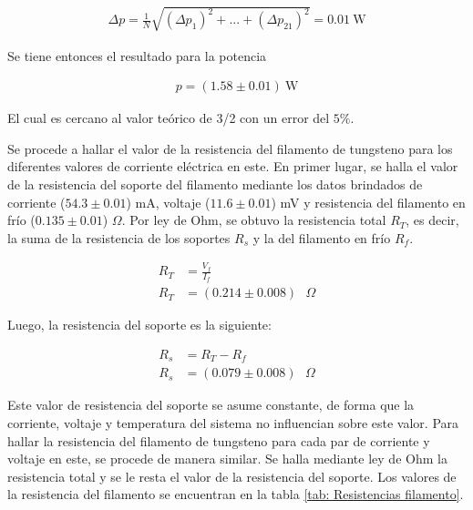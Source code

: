 \documentclass[%
 reprint,
 amsmath,amssymb,
 aps,
]{revtex4-2}
\begin{document}
\begin{align*}
    \Delta p=\frac{1}{N}\sqrt{(\Delta p_1)^2+...+(\Delta p_{21})^2}=0.01\ \text{W}
\end{align*}

\vspace{0.2 cm}
Se tiene entonces el resultado para la potencia

\begin{align*}
    p=(1.58\pm 0.01)\ \text{W}
\end{align*}

\vspace{0.2 cm}
El cual es cercano al valor teórico de 3/2 con un error del $5\%$. 

\vspace{0.2 cm}

Se procede a hallar el valor de la resistencia del filamento de tungsteno para los diferentes valores de corriente eléctrica en este. En primer lugar, se halla el valor de la resistencia del soporte del filamento mediante los datos brindados de corriente ($54.3 \pm 0.01$) mA, voltaje ($11.6 \pm 0.01$) mV y resistencia del filamento en frío ($0.135\pm 0.01$) $\Omega$. Por ley de Ohm, se obtuvo la resistencia total $R_{T}$, es decir, la suma de la resistencia de los soportes $R_{s}$ y la del filamento en frío $R_{f}$.

\begin{align*}
    R_{T} &= \frac{V_{f}}{I_{f}} \\
    R_{T} &= (0.214 \pm 0.008)\text{ $\Omega$}
\end{align*}

\vspace{0.2 cm}
Luego, la resistencia del soporte es la siguiente:

\begin{align*}
    R_{s} &= R_{T} - R_{f}\\
    R_{s} &=  (0.079 \pm 0.008)\text{ $\Omega$}
\end{align*}

\vspace{0.2 cm}
Este valor de resistencia del soporte se asume constante, de forma que la corriente, voltaje y temperatura del sistema no influencian sobre este valor. Para hallar la resistencia del filamento de tungsteno para cada par de corriente y voltaje en este, se procede de manera similar. Se halla mediante ley de Ohm la resistencia total y se le resta el valor de la resistencia del soporte. Los valores de la resistencia del filamento se encuentran en la tabla \ref{tab: Resistencias filamento}.
\\
\end{document}
